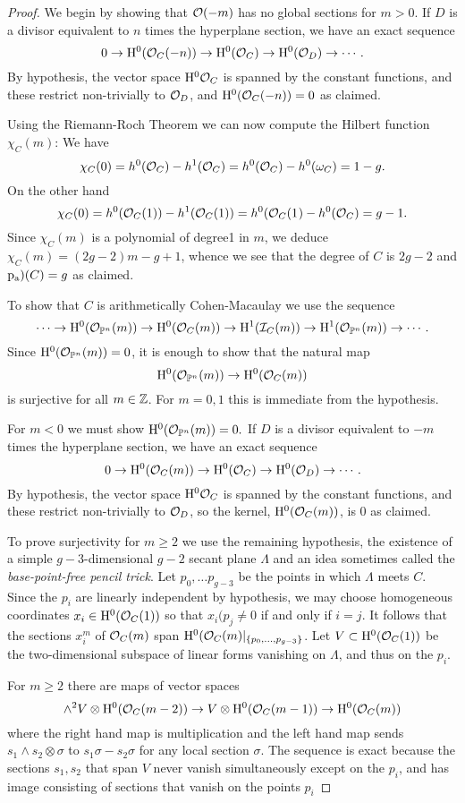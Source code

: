 \begin{proof}
We begin by showing that ${\mathcal O}(-m)$ has no global sections for $m>0$.
If $D$ is a divisor equivalent to $n$ times the hyperplane section, we have an exact sequence
$$
0\to {\rm{H}}^{0}({\mathcal O}_{C}(-n)) \to {\rm{H}}^{0}({\mathcal O}_{C}) \to {\rm{H}}^{0}({\mathcal O}_{D}) \to \cdots.
$$
By hypothesis, the vector space ${\rm{H}}^{0}{\mathcal O}_{C}$ is spanned by the constant functions, and these
restrict non-trivially to ${\mathcal O}_{D}$, and ${\rm{H}}^{0}({\mathcal O}_{C}(-n)) = 0$ as claimed.

Using the Riemann-Roch Theorem we can now compute the Hilbert function $\chi_{C}(m)$:
We have 
$$
\chi_{C}(0) = h^{0}({\mathcal O}_{C}) - h^{1}({\mathcal O}_{C}) = h^{0}({\mathcal O}_{C}) - h^{0}(\omega_{C}) = 1-g.
$$
On the other hand 
$$
\chi_{C}(0) = h^{0}({\mathcal O}_{C}(1)) - h^{1}({\mathcal O}_{C}(1)) = h^{0}({\mathcal O}_{C}(1_{}) - h^{0}({\mathcal O}_{C}) = g-1.
$$
Since $\chi_{C}(m)$ is a polynomial of degree1 in $m$, we deduce
$\chi_{C}(m) = (2g-2)m -g+1$, whence we see that the degree of $C$ is $2g-2$ and $\operatorname{\rm p_{a})}(C) = g$ as claimed.

To show that
$C$ is arithmetically Cohen-Macaulay we use the sequence
$$
\cdots \to {\rm{H}}^{0}({\mathcal O}_{{\mathbb P}^{n}}(m)) \to {\rm{H}}^{0}({\mathcal O}_{C}(m))
\to {\rm{H}}^{1}({\mathcal I}_{C}(m))\to {\rm{H}}^{1}({\mathcal O}_{{\mathbb P}^{n}}(m)) \to\cdots .
$$
Since ${\rm{H}}^{0}({\mathcal O}_{{\mathbb P}^{n}}(m)) = 0$, it
is enough to show that the natural map 
$$
{\rm{H}}^{0}({\mathcal O}_{{\mathbb P}^{n}}(m)) \to {\rm{H}}^{0}({\mathcal O}_{C}(m))
$$
 is surjective for all $m\in {\mathbb Z}$. For $m=0,1$ this is immediate from the hypothesis.

For $m <0$ we must show ${\rm{H}}^{0}({\mathcal O}_{{\mathbb P}^{n}}(m))=0.$ 
If $D$ is a divisor equivalent to $-m$ times the hyperplane section, we have an exact sequence
$$
0\to {\rm{H}}^{0}({\mathcal O}_{C}(m)) 
\to {\rm{H}}^{0}({\mathcal O}_{C}) 
\to {\rm{H}}^{0}({\mathcal O}_{D}) \to \cdots.
$$
By hypothesis, the vector space ${\rm{H}}^{0}{\mathcal O}_{C}$ is spanned by the constant functions, and these
restrict non-trivially to ${\mathcal O}_{D}$, so the kernel, ${\rm{H}}^{0}({\mathcal O}_{C}(m))$, is 0 as claimed. 

To prove surjectivity for $m\geq 2$ we use the remaining hypothesis, the existence of
a simple $g-3$-dimensional $g-2$ secant plane $\Lambda$  and an idea sometimes called the \emph{base-point-free pencil trick}. Let $p_{0},\dots p_{g-3}$ be the points in which $\Lambda$ meets $C$.  Since the
$p_{i}$ are linearly independent by hypothesis, we may choose homogeneous coordinates $x_{i} \in {\rm{H}}^{0}({\mathcal O}_{C}(1))$ so that
$x_{i}(p_{j} \neq 0$ if and only if $i = j$. It follows that the sections
$x_{i}^{m}$ of ${\mathcal O}_{C}(m)$ span ${\rm{H}}^{0}({\mathcal O}_{C}(m)|_{\{p_{0}, \dots, p_{g-3}\}}$. Let 
$V\subset {\rm{H}}^{0}({\mathcal O}_{C}(1))$ be the two-dimensional subspace of linear forms vanishing on
$\Lambda$, and thus on the $p_{i}$. 

For $m\geq 2$ there are maps of vector spaces
$$
\wedge^{2} V\otimes {\rm{H}}^{0}({\mathcal O}_{C}(m-2)) \to V\otimes {\rm{H}}^{0}({\mathcal O}_{C}(m-1)) 
\to {\rm{H}}^{0}({\mathcal O}_{C}(m))
$$
where the right hand map is multiplication and the left hand map sends
$s_{1}\wedge s_{2}\otimes \sigma$ to $s_{1}\sigma-s_{2}\sigma$ for any local section $\sigma$.
The sequence is exact because the sections $s_{1},s_{2}$ that span $V$ never vanish simultaneously except on the $p_{i}$, and has image  consisting of sections that vanish on the points $p_{i}$

\end{proof}
